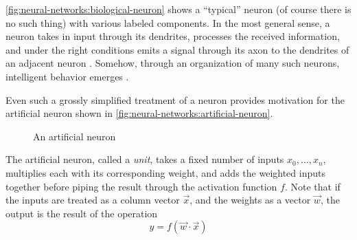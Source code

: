 \autoref{fig:neural-networks:biological-neuron} shows a ``typical'' neuron (of course there is no such thing) with various labeled components.
In the most general sense, a neuron takes in input through its dendrites, processes the received information, and under the right conditions emits a signal through its axon to the dendrites of an adjacent neuron \cite{bio_neuron}.
Somehow, through an organization of many such neurons, intelligent behavior emerges \cite{castro_2006}.

Even such a grossly simplified treatment of a neuron provides motivation for the artificial neuron shown in \autoref{fig:neural-networks:artificial-neuron}.
\begin{figure}[h]
    \centering
    \caption{An artificial neuron}\label{fig:neural-networks:artificial-neuron}
\end{figure}
The artificial neuron, called a \textit{unit}, takes a fixed number of inputs $x_0, \dots, x_n$, multiplies each with its corresponding weight, and adds the weighted inputs together before piping the result through the activation function $f$.
Note that if the inputs are treated as a column vector $\vec x$, and the weights as a vector $\vec w$, the output is the result of the operation
\begin{equation*}
    y = f(\vec w \cdot \vec x)
\end{equation*}
